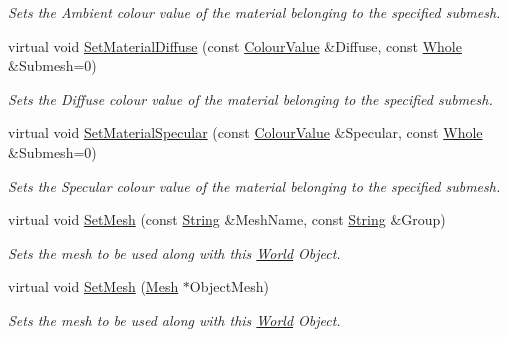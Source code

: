 \begin{DoxyCompactItemize}
\begin{DoxyCompactList}\small\item\em Sets the Ambient colour value of the material belonging to the specified submesh. \item\end{DoxyCompactList}\item 
virtual void \hyperlink{classMezzanine_1_1WorldObjectGraphicsSettings_a255ca816569198a3c7a6af188b26bf72}{SetMaterialDiffuse} (const \hyperlink{classMezzanine_1_1ColourValue}{ColourValue} \&Diffuse, const \hyperlink{namespaceMezzanine_adcbb6ce6d1eb4379d109e51171e2e493}{Whole} \&Submesh=0)
\begin{DoxyCompactList}\small\item\em Sets the Diffuse colour value of the material belonging to the specified submesh. \item\end{DoxyCompactList}\item 
virtual void \hyperlink{classMezzanine_1_1WorldObjectGraphicsSettings_adec80c34be2baa2a3eaa9605d125734f}{SetMaterialSpecular} (const \hyperlink{classMezzanine_1_1ColourValue}{ColourValue} \&Specular, const \hyperlink{namespaceMezzanine_adcbb6ce6d1eb4379d109e51171e2e493}{Whole} \&Submesh=0)
\begin{DoxyCompactList}\small\item\em Sets the Specular colour value of the material belonging to the specified submesh. \item\end{DoxyCompactList}\item 
virtual void \hyperlink{classMezzanine_1_1WorldObjectGraphicsSettings_a33259391dac7ba356848da9b27cc0a4a}{SetMesh} (const \hyperlink{namespaceMezzanine_acf9fcc130e6ebf08e3d8491aebcf1c86}{String} \&MeshName, const \hyperlink{namespaceMezzanine_acf9fcc130e6ebf08e3d8491aebcf1c86}{String} \&Group)
\begin{DoxyCompactList}\small\item\em Sets the mesh to be used along with this \hyperlink{classMezzanine_1_1World}{World} Object. \item\end{DoxyCompactList}\item 
virtual void \hyperlink{classMezzanine_1_1WorldObjectGraphicsSettings_a29ebce82dbfd0a27ddf385504341569c}{SetMesh} (\hyperlink{classMezzanine_1_1Mesh}{Mesh} $\ast$ObjectMesh)
\begin{DoxyCompactList}\small\item\em Sets the mesh to be used along with this \hyperlink{classMezzanine_1_1World}{World} Object. \item\end{DoxyCompactList}\item 

\end{DoxyCompactItemize}
